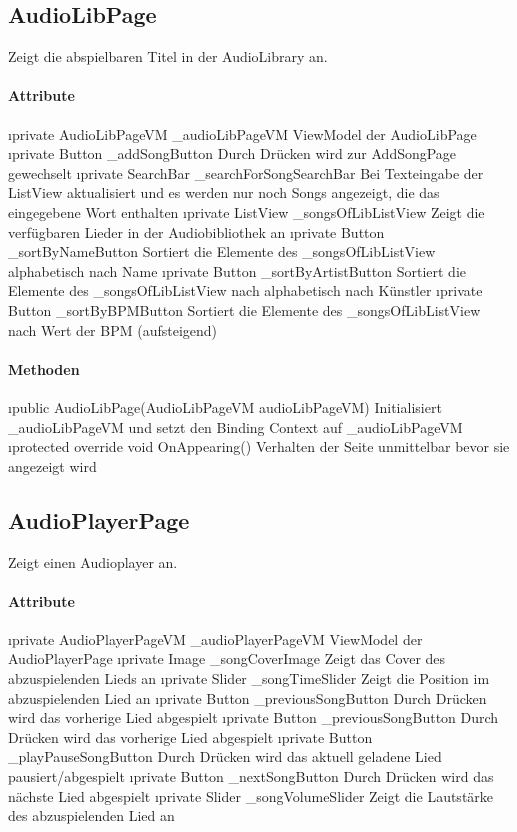\documentclass[../entwurf.tex]{subfiles}
\begin{document}
\subsection{AudioLibPage}
Zeigt die abspielbaren Titel in der AudioLibrary an.
\paragraph{Attribute}
\begin{itemize}
	\i{private AudioLibPageVM \_audioLibPageVM} ViewModel der AudioLibPage
	\i{private Button \_addSongButton} Durch Drücken wird zur AddSongPage gewechselt
	\i{private SearchBar \_searchForSongSearchBar} Bei Texteingabe der ListView aktualisiert und es werden nur noch Songs angezeigt, die das eingegebene Wort enthalten
	\i{private ListView \_songsOfLibListView} Zeigt die verfügbaren Lieder in der Audiobibliothek an
	\i{private Button \_sortByNameButton} Sortiert die Elemente des \_songsOfLibListView alphabetisch nach Name
	\i{private Button \_sortByArtistButton} Sortiert die Elemente des \_songsOfLibListView nach alphabetisch nach Künstler
	\i{private Button \_sortByBPMButton} Sortiert die Elemente des \_songsOfLibListView nach Wert der BPM (aufsteigend)
\end{itemize}

\paragraph{Methoden}
\begin{itemize}
	\i{public AudioLibPage(AudioLibPageVM audioLibPageVM)} Initialisiert \_audioLibPageVM und setzt den Binding Context 			auf \_audioLibPageVM
	\i{protected override void OnAppearing()} Verhalten der Seite unmittelbar bevor sie angezeigt wird
\end{itemize}

\subsection{AudioPlayerPage}
Zeigt einen Audioplayer an.
\paragraph{Attribute}
\begin{itemize}
	\i{private AudioPlayerPageVM \_audioPlayerPageVM} ViewModel der AudioPlayerPage
	\i{private Image \_songCoverImage} Zeigt das Cover des abzuspielenden Lieds an
	\i{private Slider \_songTimeSlider} Zeigt die Position im abzuspielenden Lied an
	\i{private Button \_previousSongButton} Durch Drücken wird das vorherige Lied abgespielt
	\i{private Button \_previousSongButton} Durch Drücken wird das vorherige Lied abgespielt
	\i{private Button \_playPauseSongButton} Durch Drücken wird das aktuell geladene Lied pausiert/abgespielt
	\i{private Button \_nextSongButton} Durch Drücken wird das nächste Lied abgespielt
	\i{private Slider \_songVolumeSlider} Zeigt die Lautstärke des abzuspielenden Lied an
\end{itemize}
\end{document}
